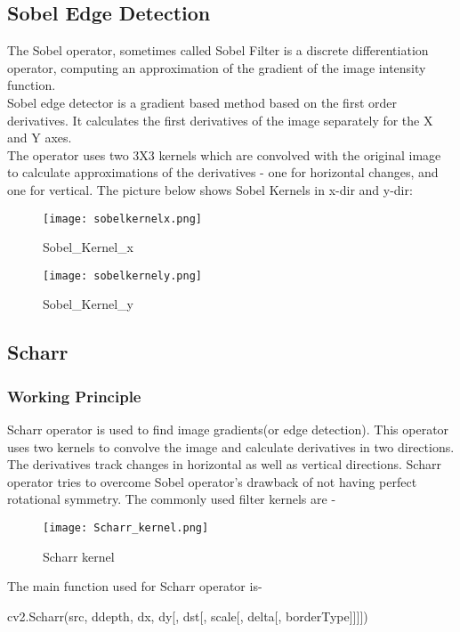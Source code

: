 \documentclass[]{article}
\newenvironment{Shaded}{}{}
\newcommand{\NormalTok}[1]{{#1}}
\begin{document}
\subsection{Sobel Edge Detection}\label{sobel-edge-detection}

The Sobel operator, sometimes called Sobel Filter is a discrete
differentiation operator, computing an approximation of the gradient of
the image intensity function.\\
Sobel edge detector is a gradient based method based on the first order
derivatives. It calculates the first derivatives of the image separately
for the X and Y axes.\\
The operator uses two 3X3 kernels which are convolved with the original
image to calculate approximations of the derivatives - one for
horizontal changes, and one for vertical. The picture below shows Sobel
Kernels in x-dir and y-dir:\\
\begin{figure}
\centering
\texttt{[image: sobelkernelx.png]}
\caption{Sobel\_Kernel\_x}
\texttt{[image: sobelkernely.png]}
\caption{Sobel\_Kernel\_y}
\end{figure}

\subsection{Scharr}\label{scharr}

\subsubsection{Working Principle}\label{working-principle}

Scharr operator is used to find image gradients(or edge detection). This
operator uses two kernels to convolve the image and calculate
derivatives in two directions. The derivatives track changes in
horizontal as well as vertical directions. Scharr operator tries to
overcome Sobel operator's drawback of not having perfect rotational
symmetry. The commonly used filter kernels are -

\begin{figure}[htbp]
\centering
\texttt{[image: Scharr\_kernel.png]}
\caption{Scharr kernel}
\end{figure}

The main function used for Scharr operator is-

\begin{Shaded}
\begin{Highlighting}[]
    \NormalTok{cv2.Scharr(src, ddepth, dx, dy[, dst[, scale[, delta[, borderType]]]])}
\end{Highlighting}
\end{Shaded}
\end{document}
